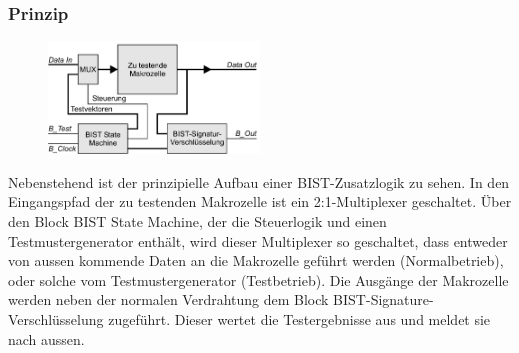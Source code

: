 \subsubsection{Prinzip}
\begin{multicols}{2}
\begin{figure}[H]
    \includegraphics[width=0.5\textwidth]{images/prinzip_bist.png}
\end{figure}
Nebenstehend ist der prinzipielle Aufbau einer BIST-Zusatzlogik zu sehen. In den Eingangspfad der zu testenden Makrozelle ist ein 2:1-Multiplexer geschaltet. Über den Block BIST State Machine, der die Steuerlogik und einen Testmustergenerator enthält, wird dieser Multiplexer so geschaltet, dass entweder von aussen kommende Daten an die Makrozelle geführt werden (Normalbetrieb), oder solche vom Testmustergenerator (Testbetrieb). Die Ausgänge der Makrozelle werden neben der normalen Verdrahtung dem Block BIST-Signature-Verschlüsselung zugeführt. Dieser wertet die Testergebnisse aus und meldet sie nach aussen.
\end{multicols}
%
%
